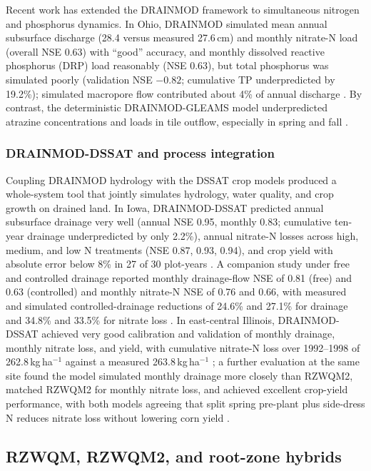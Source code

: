 Recent work has extended the DRAINMOD framework to simultaneous nitrogen and phosphorus dynamics. In Ohio, DRAINMOD simulated mean annual subsurface discharge (28.4 versus measured 27.6\,cm) and monthly nitrate-N load (overall NSE 0.63) with ``good'' accuracy, and monthly dissolved reactive phosphorus (DRP) load reasonably (NSE 0.63), but total phosphorus was simulated poorly (validation NSE $-0.82$; cumulative TP underpredicted by 19.2\%); simulated macropore flow contributed about 4\% of annual discharge \parencite{Askar2025}. By contrast, the deterministic DRAINMOD-GLEAMS model underpredicted atrazine concentrations and loads in tile outflow, especially in spring and fall \parencite{Rudra2005}.

\subsubsection{DRAINMOD-DSSAT and process integration}

Coupling DRAINMOD hydrology with the DSSAT crop models produced a whole-system tool that jointly simulates hydrology, water quality, and crop growth on drained land. In Iowa, DRAINMOD-DSSAT predicted annual subsurface drainage very well (annual NSE 0.95, monthly 0.83; cumulative ten-year drainage underpredicted by only 2.2\%), annual nitrate-N losses across high, medium, and low N treatments (NSE 0.87, 0.93, 0.94), and crop yield with absolute error below 8\% in 27 of 30 plot-years \parencite{Negm2014}. A companion study under free and controlled drainage reported monthly drainage-flow NSE of 0.81 (free) and 0.63 (controlled) and monthly nitrate-N NSE of 0.76 and 0.66, with measured and simulated controlled-drainage reductions of 24.6\% and 27.1\% for drainage and 34.8\% and 33.5\% for nitrate loss \parencite{Negm2017}. In east-central Illinois, DRAINMOD-DSSAT achieved very good calibration and validation of monthly drainage, monthly nitrate loss, and yield, with cumulative nitrate-N loss over 1992--1998 of 262.8\,kg\,ha$^{-1}$ against a measured 263.8\,kg\,ha$^{-1}$ \parencite{Singh2020b}; a further evaluation at the same site found the model simulated monthly drainage more closely than RZWQM2, matched RZWQM2 for monthly nitrate loss, and achieved excellent crop-yield performance, with both models agreeing that split spring pre-plant plus side-dress N reduces nitrate loss without lowering corn yield \parencite{Singh2022c}.

\subsection{RZWQM, RZWQM2, and root-zone hybrids}

